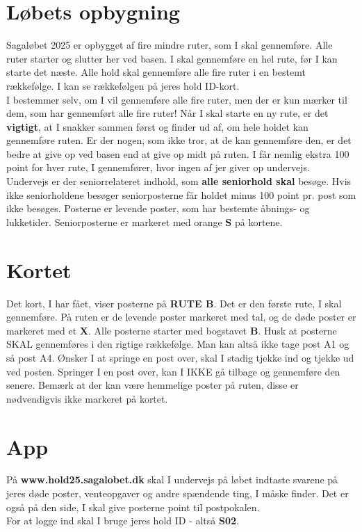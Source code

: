 \section{Løbets opbygning}
Sagaløbet 2025 er opbygget af fire mindre ruter, som I skal gennemføre. Alle ruter starter og slutter her ved basen. I skal gennemføre en hel rute, før I kan starte det næste. Alle hold skal gennemføre alle fire ruter i en bestemt rækkefølge. I kan se rækkefølgen på jeres hold ID-kort.\\\newline
I bestemmer selv, om I vil gennemføre alle fire ruter, men der er kun mærker til dem, som har gennemført alle fire ruter! Når I skal starte en ny rute, er det \textbf{vigtigt}, at I snakker sammen først og finder ud af, om hele holdet kan gennemføre ruten. Er der nogen, som ikke tror, at de kan gennemføre den, er det bedre at give op ved basen end at give op midt på ruten. I får nemlig ekstra 100 point for hver rute, I gennemfører, hvor ingen af jer giver op undervejs.\\
\newline
Undervejs er der seniorrelateret indhold, som \textbf{alle seniorhold skal} besøge. Hvis ikke seniorholdene besøger seniorposterne får holdet minus 100 point pr. post som ikke besøges. Posterne er levende poster, som har bestemte åbnings- og lukketider. Seniorposterne er markeret med orange \textbf{S} på kortene.\\
\newline
\section{Kortet}
Det kort, I har fået, viser posterne på \textbf{RUTE B}. Det er den første rute, I skal gennemføre. På ruten er de levende poster markeret med tal, og de døde poster er markeret med et \textbf{X}. Alle posterne starter med bogstavet \textbf{B}. Husk at posterne SKAL gennemføres i den rigtige rækkefølge. Man kan altså ikke tage post A1 og så post A4. Ønsker I at springe en post over, skal I stadig tjekke ind og tjekke ud ved posten. Springer I en post over, kan I IKKE gå tilbage og gennemføre den senere. Bemærk at der kan være hemmelige poster på ruten, disse er nødvendigvis ikke markeret på kortet.
\section{App}
På \textbf{www.hold25.sagalobet.dk} skal I undervejs på løbet indtaste svarene på jeres døde poster, venteopgaver og andre spændende ting, I måske finder. Det er også på den side, I skal give posterne point til postpokalen.\\
For at logge ind skal I bruge jeres hold ID - altså \textbf{S02}.
\newpage

